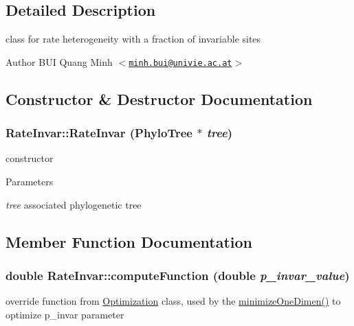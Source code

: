 \subsection{Detailed Description}
class for rate heterogeneity with a fraction of invariable sites

\begin{DoxyAuthor}{Author}
BUI Quang Minh $<$\href{mailto:minh.bui@univie.ac.at}{\tt minh.bui@univie.ac.at}$>$ 
\end{DoxyAuthor}


\subsection{Constructor \& Destructor Documentation}
\hypertarget{classRateInvar_ae78abd45146e41b786f6e0a7b8bd5747}{
\subsubsection[{RateInvar}]{\setlength{\rightskip}{0pt plus 5cm}RateInvar::RateInvar ({\bf PhyloTree} $\ast$ {\em tree})}}
\label{classRateInvar_ae78abd45146e41b786f6e0a7b8bd5747}
constructor 
\begin{DoxyParams}{Parameters}
\item[{\em tree}]associated phylogenetic tree \end{DoxyParams}


\subsection{Member Function Documentation}
\hypertarget{classRateInvar_a23d4b3aed6205e4f121a3aee43996a49}{
\subsubsection[{computeFunction}]{\setlength{\rightskip}{0pt plus 5cm}double RateInvar::computeFunction (double {\em p\_\-invar\_\-value})}}
\label{classRateInvar_a23d4b3aed6205e4f121a3aee43996a49}
override function from \hyperlink{classOptimization}{Optimization} class, used by the \hyperlink{classOptimization_a59ccdfae81744716ce48226da029d470}{minimizeOneDimen()} to optimize p\_\-invar parameter 

